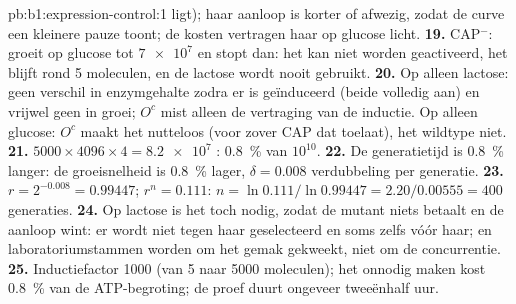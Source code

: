 \begin{solution}{pb:b1:expression-control:1}
ligt); haar aanloop is korter of afwezig, zodat de curve een kleinere pauze toont;
de kosten vertragen haar op glucose licht.
\textbf{19.} CAP$^-$: groeit op glucose tot $\num{7e7}$ en stopt dan: het
 kan niet worden geactiveerd, het  blijft rond 5 moleculen, en de
lactose wordt nooit gebruikt.
\textbf{20.} Op alleen lactose: geen verschil in enzymgehalte zodra er is
geïnduceerd (beide volledig aan) en vrijwel geen in groei; $O^c$ mist alleen de
vertraging van de inductie. Op alleen glucose: $O^c$ maakt het  nutteloos (voor
zover CAP dat toelaat), het wildtype niet.
\textbf{21.} $5000\times 4096\times 4 = \num{8.2e7}$ : \qty{0.8}{\%} van
$10^{10}$.
\textbf{22.} De generatietijd is \qty{0.8}{\%} langer: de groeisnelheid is
\qty{0.8}{\%} lager, $\delta = 0.008$ verdubbeling per generatie.
\textbf{23.} $r = 2^{-0.008} = 0.99447$; $r^n = 0.111$: $n =
\ln 0.111/\ln 0.99447 = 2.20/0.00555 = 400$ generaties.
\textbf{24.} Op lactose is het  toch nodig, zodat de mutant niets betaalt en
de aanloop wint: er wordt niet tegen haar geselecteerd en soms zelfs vóór haar; en
laboratoriumstammen worden om het gemak gekweekt, niet om de concurrentie.
\textbf{25.} Inductiefactor 1000 (van 5 naar \num{5000} moleculen); het onnodig
maken kost \qty{0.8}{\%} van de ATP-begroting; de proef duurt ongeveer tweeënhalf
uur.
\end{solution}

